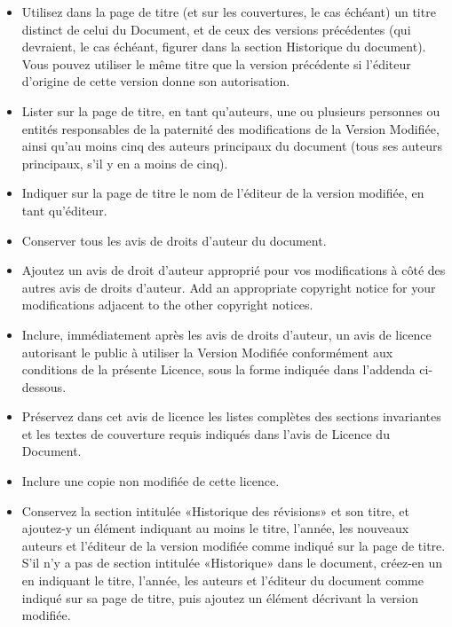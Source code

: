 	\begin{itemize}
		\item Utilisez dans la page de titre (et sur les couvertures, le cas échéant) un titre distinct de celui du Document, et de ceux des versions précédentes (qui devraient, le cas échéant, figurer dans la section Historique du document). Vous pouvez utiliser le même titre que la version précédente si l'éditeur d'origine de cette version donne son autorisation.

		\item Lister sur la page de titre, en tant qu'auteurs, une ou plusieurs personnes ou entités responsables de la paternité des modifications de la Version Modifiée, ainsi qu'au moins cinq des auteurs principaux du document (tous ses auteurs principaux, s'il y en a moins de cinq).

		\item Indiquer sur la page de titre le nom de l'éditeur de la version modifiée, en tant qu'éditeur.

		\item Conserver tous les avis de droits d'auteur du document.

		\item Ajoutez un avis de droit d'auteur approprié pour vos modifications à côté des autres avis de droits d'auteur. Add an appropriate copyright notice for your modifications adjacent to the other copyright notices. 

		\item Inclure, immédiatement après les avis de droits d'auteur, un avis de licence autorisant le public à utiliser la Version Modifiée conformément aux conditions de la présente Licence, sous la forme indiquée dans l'addenda ci-dessous.

		\item Préservez dans cet avis de licence les listes complètes des sections invariantes et les textes de couverture requis indiqués dans l'avis de Licence du Document.

		\item Inclure une copie non modifiée de cette licence.

		\item Conservez la section intitulée «Historique des révisions» et son titre, et ajoutez-y un élément indiquant au moins le titre, l'année, les nouveaux auteurs et l'éditeur de la version modifiée comme indiqué sur la page de titre. S'il n'y a pas de section intitulée «Historique» dans le document, créez-en un en indiquant le titre, l'année, les auteurs et l'éditeur du document comme indiqué sur sa page de titre, puis ajoutez un élément décrivant la version modifiée.


\end{itemize}
